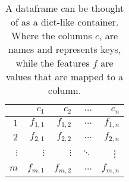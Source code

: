 \begin{table}[ht]
    \centering
    \begin{tabular}{| r | r r r r |}
        \hline
                    & $c_1$     & $c_2$     & $\dots$   & $c_n$     \\
        \hline
        $1$         & $f_{1,1}$ & $f_{1,2}$ & $\dots$   & $f_{1,n}$ \\
        $2$         & $f_{2,1}$ & $f_{2,2}$ & $\dots$   & $f_{2,n}$ \\
        $\vdots$    & $\vdots$  & $\vdots$  & $\ddots$  & \vdots    \\
        $m$         & $f_{m,1}$ & $f_{m,2}$ & $\dots$   & $f_{m,n}$ \\
        \hline
    \end{tabular}
    \caption[Structure - Dataframe ]{A dataframe can be thought of as a dict-like container. Where the columns $c$, are names and represents keys, while the features $f$ are values that are mapped to a column.}
    \label{tab:dataframe}
\end{table}